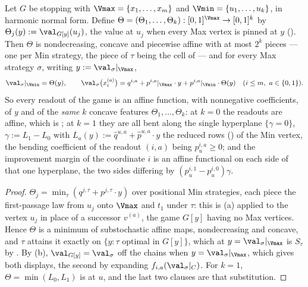 \begin{theorem}\label{mb:features}
Let $G$ be stopping with $\Vmax=\{x_1,\dots,x_m\}$ and
$\Vmin=\{u_1,\dots,u_k\}$, in harmonic normal form. Define
$\Theta=(\Theta_1,\dots,\Theta_k):[0,1]^{\Vmax}\to[0,1]^{k}$ by
$\Theta_j(y):=\val_{G[y]}(u_j)$, the value at $u_j$ when every Max vertex
is pinned at $y$ (). Then $\Theta$ is nondecreasing,
concave and piecewise affine with at most $2^{k}$ pieces --- one per Min
strategy, the piece of $\tau$ being the cell of  --- and
for every Max strategy $\sigma$, writing $y:=\val_\sigma|_{\Vmax}$,
\[
  \val_\sigma|_{\Vmin}=\Theta(y),\qquad
  \val_\sigma\bigl(x_i^{(a)}\bigr)
   =q^{i,a}+p^{i,a}|_{\Vmax}\cdot y+p^{i,a}|_{\Vmin}\cdot\Theta(y)
   \quad(i\le m,\ a\in\{0,1\}).
\]
So every readout of the game is an affine function, with nonnegative
coefficients, of $y$ and of the \emph{same} $k$ concave features
$\Theta_1,\dots,\Theta_k$: at $k=0$ the readouts are affine, which is
; at $k=1$ they are all bent along the single
hyperplane $\{\gamma=0\}$, $\gamma:=L_1-L_0$ with
$L_a(y):=\hat q^{u,a}+\hat p^{u,a}\cdot y$ the reduced rows
() of the Min vertex, the bending coefficient of the
readout $(i,a)$ being $p^{i,a}_{u}\ge0$; and the improvement margin of the
coordinate $i$ is an affine functional on each side of that one hyperplane,
the two sides differing by $(p^{i,1}_{u}-p^{i,0}_{u})\gamma$.
\end{theorem}

\begin{proof}
$\Theta_j=\min_\tau(q^{j,\tau}+p^{j,\tau}\cdot y)$ over positional Min
strategies, each piece the first-passage law from $u_j$ onto $\Vmax$ and
$t_1$ under $\tau$: this is (a) applied to the vertex
$u_j$ in place of a successor $v^{(a)}$, the game $G[y]$ having no Max
vertices. Hence $\Theta$ is a minimum of substochastic affine maps,
nondecreasing and concave, and $\tau$ attains it exactly on
$\{y:\tau\text{ optimal in }G[y]\}$, which at $y=\val_\sigma|_{\Vmax}$ is
$S_\tau$ by . By (b),
$\val_{G[y]}=\val_\sigma$ off the chains when $y=\val_\sigma|_{\Vmax}$,
which gives both displays, the second by expanding
$f_{i,a}(\val_\sigma|_C)$. For $k=1$, $\Theta=\min(L_0,L_1)$ is
 at $u$, and the last two clauses are that
substitution.
\end{proof}

